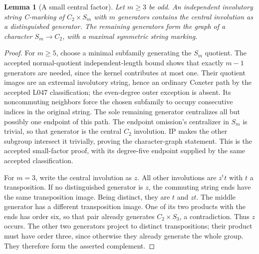 \documentclass[11pt,a4paper]{article}
\newtheorem{lemma}{Lemma}
\begin{document}
\begin{lemma}[A small central factor]
Let $m\geq3$ be odd. An independent involutory string
C-marking of $C_2\times S_m$ with $m$ generators contains
the central involution as a distinguished generator.
The remaining generators form the graph of a character
$S_m\to C_2$, with a maximal symmetric string marking.
\end{lemma}
\begin{proof}
For $m\geq5$, choose a minimal subfamily generating the
$S_m$ quotient. The accepted normal-quotient independent-length
bound shows that exactly $m-1$ generators are needed, since
the kernel contributes at most one. Their quotient images
are an extremal involutory string, hence an ordinary
Coxeter path by the accepted L047 classification; the
even-degree outer exception is absent. Its noncommuting
neighbors force the chosen subfamily to occupy consecutive
indices in the original string. The sole remaining
generator centralizes all but possibly one endpoint of
this path. The endpoint omission's centralizer in $S_m$
is trivial, so that generator is the central $C_2$
involution. IP makes the other subgroup intersect it
trivially, proving the character-graph statement. This is
the accepted small-factor proof, with its degree-five
endpoint supplied by the same accepted classification.

For $m=3$, write the central involution as $z$. All other
involutions are $z^\epsilon t$ with $t$ a transposition.
If no distinguished generator is $z$, the commuting
string ends have the same transposition image. Being
distinct, they are $t$ and $zt$. The middle generator
has a different transposition image. One of its two
products with the ends has order six, so that pair
already generates $C_2\times S_3$, a contradiction.
Thus $z$ occurs. The other two generators project to
distinct transpositions; their product must have order
three, since otherwise they already generate the whole
group. They therefore form the asserted complement.
\end{proof}
\end{document}
